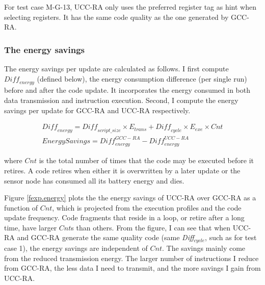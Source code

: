 For test case M-G-13, UCC-RA only uses the preferred register tag as hint
when selecting registers. It has the same code quality as the one
generated by GCC-RA.

\subsubsection{The energy savings}
The energy savings per update are calculated as follows. I first
compute $\textit{Diff}_{energy}$ (defined below), the energy consumption
difference (per single run) before and after the code update. It
incorporates the energy consumed in both data transmission and
instruction execution. Second, I compute the energy savings per
update for GCC-RA and UCC-RA respectively.

\begin{small}
\begin{eqnarray}
\textit{Diff}_{energy} =
\textit{Diff}_{script\_size} \times E_{trans} + \textit{Diff}_{cycle} \times E_{exe} \times Cnt \\
Energy Savings =
\textit{Diff}_{energy}^{GCC-RA} - \textit{Diff}_{energy}^{UCC-RA}
\end{eqnarray}
\end{small}

\noindent
where $Cnt$ is the total number of times that the code may be executed
before it retires. A code retires when either it is overwritten by
a later update or the sensor node has consumed all its battery energy
and dies.

Figure \ref{fexp.energy} plots the the energy savings of UCC-RA over
GCC-RA as a function of $Cnt$, which is projected from the execution
profiles and the code update frequency. Code fragments that reside in
a loop, or retire after a long time, have larger $Cnt$s than
others. From the figure, I can see that when UCC-RA and GCC-RA
generate the same quality code (same \textit{Diff$_{cycle}$}, such as for test
case 1), the energy savings are independent of $Cnt$. The savings
mainly come from the reduced transmission energy. The larger number
of instructions I reduce from GCC-RA, the less data I need to
transmit, and the more savings I gain from UCC-RA.

